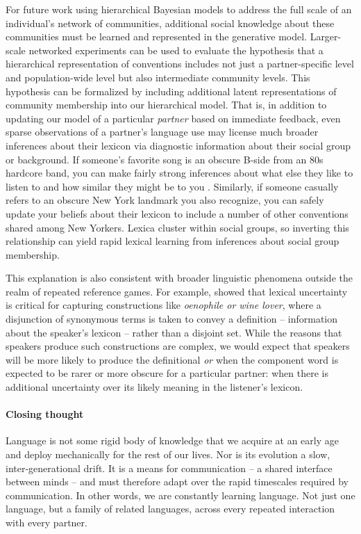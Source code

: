 For future work using hierarchical Bayesian models to address the full scale of an individual's  network of communities, additional social knowledge about these communities must be learned and represented in the generative model.
Larger-scale networked experiments can be used to evaluate the hypothesis that a hierarchical representation of conventions includes not just a partner-specific level and population-wide level but also intermediate community levels. 
This hypothesis can be formalized by including additional latent representations of community membership into our hierarchical model.
That is, in addition to updating our model of a particular \emph{partner} based on immediate feedback, even sparse observations of a partner's language use may license much broader inferences about their lexicon via diagnostic information about their social group or background. 
If someone's favorite song is an obscure B-side from an 80s hardcore band, you can make fairly strong inferences about what else they like to listen to and how similar they might be to you \cite{VelezEtAl16_Overlaps, GershmanEtAl17_StructureSocialInfluence}. 
Similarly, if someone casually refers to an obscure New York landmark you also recognize, you can safely update your beliefs about their lexicon to include a number of other conventions shared among New Yorkers. 
Lexica cluster within social groups, so inverting this relationship can yield rapid lexical learning from inferences about social group membership.

This explanation is also consistent with broader linguistic phenomena outside the realm of repeated reference games. 
For example,  showed that lexical uncertainty is critical for capturing constructions like \emph{oenophile or wine lover}, where a disjunction of synonymous terms is taken to convey a definition -- information about the speaker's lexicon -- rather than a disjoint set. 
While the reasons that speakers produce such constructions are complex, we would expect that speakers will be more likely to produce the definitional \emph{or} when the component word is expected to be rarer or more obscure for a particular partner: when there is additional uncertainty over its likely meaning in the listener's lexicon.

\paragraph{Closing thought}

Language is not some rigid body of knowledge that we acquire at an early age and deploy mechanically for the rest of our lives. 
Nor is its evolution a slow, inter-generational drift. 
It is a means for communication -- a shared interface between minds -- and must therefore adapt over the rapid timescales required by communication. 
In other words, we are constantly learning language. 
Not just one language, but a family of related languages, across every repeated interaction with every partner. 

